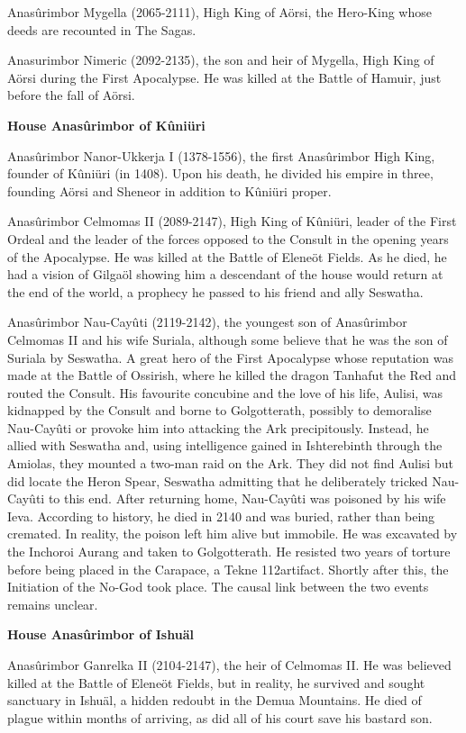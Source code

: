 \documentclass[]{book}
\begin{document}
Anasûrimbor Mygella (2065-2111), High King of Aörsi, the Hero-King whose
deeds are recounted in The Sagas.

Anasurimbor Nimeric (2092-2135), the son and heir of Mygella, High King of Aörsi
during the First Apocalypse. He was killed at the Battle of Hamuir, just before
the fall of Aörsi.

\textbf{House Anasûrimbor of Kûniüri}

Anasûrimbor Nanor-Ukkerja I (1378-1556), the first Anasûrimbor High King,
founder of Kûniüri (in 1408). Upon his death, he divided his empire in three,
founding Aörsi and Sheneor in addition to Kûniüri proper.

Anasûrimbor Celmomas II (2089-2147), High King of Kûniüri, leader of the First
Ordeal and the leader of the forces opposed to the Consult in the opening years
of the Apocalypse. He was killed at the Battle of Eleneöt Fields. As he died, he
had a vision of Gilgaöl showing him a descendant of the house would return at
the end of the world, a prophecy he passed to his friend and ally Seswatha.

Anasûrimbor Nau-Cayûti (2119-2142), the youngest son of Anasûrimbor
Celmomas II and his wife Suriala, although some believe that he was the son of
Suriala by Seswatha. A great hero of the First Apocalypse whose reputation was
made at the Battle of Ossirish, where he killed the dragon Tanhafut the Red
and routed the Consult. His favourite concubine and the love of his life, Aulisi,
was kidnapped by the Consult and borne to Golgotterath, possibly to
demoralise Nau-Cayûti or provoke him into attacking the Ark precipitously.
Instead, he allied with Seswatha and, using intelligence gained in Ishterebinth
through the Amiolas, they mounted a two-man raid on the Ark. They did not
find Aulisi but did locate the Heron Spear, Seswatha admitting that he
deliberately tricked Nau-Cayûti to this end. After returning home, Nau-Cayûti
was poisoned by his wife Ieva. According to history, he died in 2140 and was
buried, rather than being cremated. In reality, the poison left him alive but
immobile. He was excavated by the Inchoroi Aurang and taken to Golgotterath.
He resisted two years of torture before being placed in the Carapace, a Tekne
112artifact. Shortly after this, the Initiation of the No-God took place. The causal
link between the two events remains unclear.

\textbf{House Anasûrimbor of Ishuäl}

Anasûrimbor Ganrelka II (2104-2147), the heir of Celmomas II. He was believed
killed at the Battle of Eleneöt Fields, but in reality, he survived and sought
sanctuary in Ishuäl, a hidden redoubt in the Demua Mountains. He died of
plague within months of arriving, as did all of his court save his bastard son.
\end{document}
